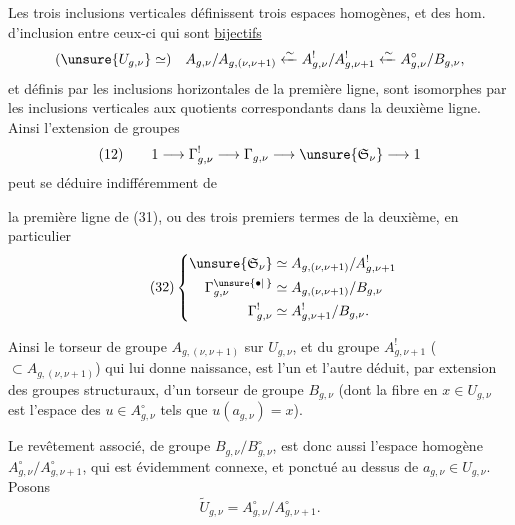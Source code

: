 Les trois inclusions verticales définissent trois espaces homogènes, et  des hom. d'inclusion entre ceux-ci qui sont \uline{bijectifs}
\[
(\unsure{U_{g,\nu}}\simeq)\quad
A_{g,\nu}/A_{g,(\nu,\nu+1)}
\xleftarrow{\sim} A_{g,\nu}^{!}/A_{g,\nu+1}^{!}
\xleftarrow{\sim} A_{g,\nu}^{\circ}/B_{g,\nu},
\]
et    définis par les inclusions horizontales de la première ligne, sont isomorphes par les inclusions verticales aux quotients correspondants dans la deuxième ligne. Ainsi l'extension de groupes
\[
(12)\qquad 1\longrightarrow\Gamma_{g,\nu}^{!}\longrightarrow\Gamma_{g,\nu}\longrightarrow\unsure{\mathfrak S_\nu}\longrightarrow1
\]
peut  se déduire indifféremment de

la première ligne de (31), ou des trois premiers termes de la deuxième, en particulier
\[
\tag{32}
\left\{\begin{aligned}
\unsure{\mathfrak S_\nu}&\simeq A_{g,(\nu,\nu+1)}/A_{g,\nu+1}^{!}\\
\Gamma_{g,\nu}^{\unsure{\bullet|\,}}&\simeq A_{g,(\nu,\nu+1)}/B_{g,\nu}\\
\Gamma_{g,\nu}^{!}&\simeq A_{g,\nu+1}^{!}/B_{g,\nu}.
\end{aligned}\right.
\]

Ainsi le torseur  de groupe $A_{g,(\nu,\nu+1)}$  sur  $U_{g,\nu}$, et  du groupe $A_{g,\nu+1}^{!}$ ($\subset A_{g,(\nu,\nu+1)}$) qui lui donne naissance, est l'un et l'autre déduit, par extension des groupes structuraux, d'un torseur de groupe $B_{g,\nu}$ (dont la fibre en $x\in U_{g,\nu}$ est l'espace des  $u\in A_{g,\nu}^{\circ}$ tels que $u(a_{g,\nu})=x$).

Le revêtement  associé, de groupe $B_{g,\nu}/B_{g,\nu}^{\circ}$, est donc aussi l'espace homogène $A_{g,\nu}^{\circ}/A_{g,\nu+1}^{\circ}$, qui est évidemment connexe, et ponctué au dessus de $a_{g,\nu}\in U_{g,\nu}$. Posons
\[
\tag{33}
\widetilde U_{g,\nu}=A_{g,\nu}^{\circ}/A_{g,\nu+1}^{\circ}.
\]

